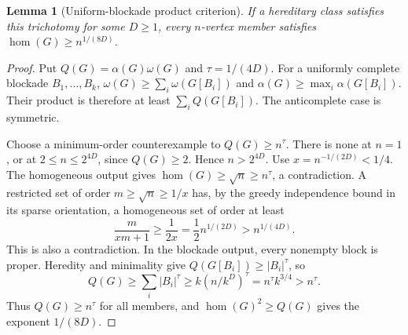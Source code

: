 \documentclass[11pt,a4paper]{article}
\newtheorem{lemma}[theorem]{Lemma}
\theoremstyle{definition}
\theoremstyle{remark}
\numberwithin{equation}{section}
\begin{document}
\begin{lemma}[Uniform-blockade product criterion]\label{lem:product}
If a hereditary class satisfies this trichotomy for some \(D\ge1\), every \(n\)-vertex member satisfies \(\hom(G)\ge n^{1/(8D)}\).
\end{lemma}
\begin{proof}
Put \(Q(G)=\alpha(G)\omega(G)\) and \(\tau=1/(4D)\). For a uniformly complete blockade \(B_1,\ldots,B_k\),
\(\omega(G)\ge\sum_i\omega(G[B_i])\) and \(\alpha(G)\ge\max_i\alpha(G[B_i])\). Their product is therefore at least \(\sum_iQ(G[B_i])\). The anticomplete case is symmetric.

Choose a minimum-order counterexample to \(Q(G)\ge n^\tau\). There is none at \(n=1\), or at \(2\le n\le2^{4D}\), since \(Q(G)\ge2\). Hence \(n>2^{4D}\). Use \(x=n^{-1/(2D)}<1/4\). The homogeneous output gives \(\hom(G)\ge\sqrt n\ge n^\tau\), a contradiction. A restricted set of order \(m\ge\sqrt n\ge1/x\) has, by the greedy independence bound in its sparse orientation, a homogeneous set of order at least
\[
 \frac{m}{xm+1}\ge\frac1{2x}=\frac12 n^{1/(2D)}>n^{1/(4D)}.
\]
This is also a contradiction. In the blockade output, every nonempty block is proper. Heredity and minimality give \(Q(G[B_i])\ge|B_i|^\tau\), so
\[
 Q(G)\ge\sum_i |B_i|^\tau
 \ge k(n/k^D)^\tau=n^\tau k^{3/4}>n^\tau.
\]
Thus \(Q(G)\ge n^\tau\) for all members, and \(\hom(G)^2\ge Q(G)\) gives the exponent \(1/(8D)\).
\end{proof}
\end{document}

